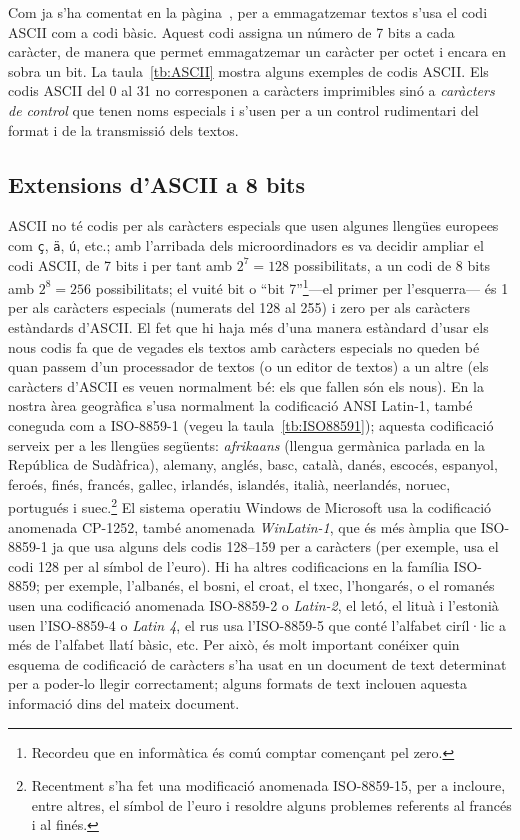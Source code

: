 Com ja s'ha comentat en la pàgina~\pageref{pg:ASCII}, per a
emmagatzemar textos s'usa el codi ASCII com a codi bàsic. Aquest codi
assigna un número de 7 bits a cada caràcter, de manera que permet
emmagatzemar un caràcter per octet i encara en sobra un bit. La
taula~\ref{tb:ASCII} mostra alguns exemples de codis ASCII. Els codis
ASCII del 0 al 31 no corresponen a caràcters imprimibles sinó a
\emph{caràcters de control} que tenen noms especials i s'usen per a un
control rudimentari del format i de la transmissió dels textos.

\subsection{Extensions d'ASCII a 8 bits}

ASCII no té codis per als caràcters especials que usen algunes
llengües europees com \texttt{ç}, \texttt{ä}, \texttt{ú}, etc.; amb
l'arribada dels microordinadors es va decidir ampliar el codi ASCII,
de 7 bits i per tant amb $2^7=128$ possibilitats, a un codi de 8 bits
amb $2^8=256$ possibilitats; el vuité bit o ``bit
7''\footnote{Recordeu que en informàtica és comú comptar començant pel
  zero.}---el primer per l'esquerra--- és 1 per als caràcters
especials (numerats del 128 al 255) i zero per als caràcters
estàndards d'ASCII.  El fet que hi haja més d'una manera estàndard
d'usar els nous codis fa que de vegades els textos amb caràcters
especials no queden bé quan passem d'un processador de textos (o un
editor de textos) a un altre (els caràcters d'ASCII es veuen
normalment bé: els que fallen són els nous).  En la nostra àrea
geogràfica s'usa normalment la codificació ANSI Latin-1, també
coneguda com a ISO-8859-1 (vegeu la taula~\ref{tb:ISO88591});
aquesta codificació serveix per a les llengües següents:
\emph{afrikaans} (llengua germànica parlada en la República de Sudàfrica),
alemany, anglés, basc, català, danés, escocés,
espanyol, feroés, finés, francés, gallec, irlandés, islandés, italià,
neerlandés, noruec, portugués i suec.\footnote{Recentment s'ha fet una
  modificació anomenada ISO-8859-15, per a incloure, entre altres, el
  símbol de l'euro i resoldre alguns problemes referents al francés i
  al finés.}  El sistema operatiu Windows de Microsoft usa la
codificació anomenada CP-1252, també anomenada \emph{WinLatin-1}, que
és més àmplia que ISO-8859-1 ja que usa alguns dels codis 128--159 per
a caràcters (per exemple, usa el
codi 128 per al símbol de l'euro). Hi ha altres
codificacions en la família ISO-8859; per exemple, l'albanés, el
bosni, el croat, el txec, l'hongarés, o el romanés usen una
codificació anomenada ISO-8859-2 o \emph{Latin-2}, el letó, el lituà i
l'estonià usen l'ISO-8859-4 o \emph{Latin 4}, el rus usa l'ISO-8859-5
que conté l'alfabet ciríl·lic a més de l'alfabet llatí bàsic, etc. Per
això, és molt important conéixer quin esquema de codificació de
caràcters s'ha usat en un document de text determinat per a poder-lo
llegir correctament; alguns formats de text inclouen aquesta
informació dins del mateix document.


